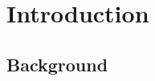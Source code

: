 \documentclass[draft,final]{thesisclass} %
\begin{document}
\frontmatter %

\addstatementpage


\begin{acknowledgements*}
\lipsum[1]
\end{acknowledgements*}

\begin{abstract}
\lipsum[1]
\end{abstract}


\tableofcontents %

\mainmatter

\chapter{Introduction}

\section{Background}
\end{document}
